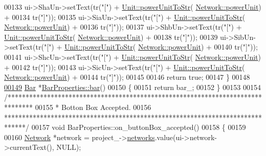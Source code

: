 \begin{DoxyCode}
00133   ui->ShaUn->setText(tr(\textcolor{stringliteral}{"["}) + \hyperlink{class_unit_ad1487441b5a7eb93a3eb0aeebe947725}{Unit::powerUnitToStr}(
      \hyperlink{group___models_ga9504015bc566f4a3d3b4d4a86000293b}{Network::powerUnit}) +
00134                      tr(\textcolor{stringliteral}{"]"}));
00135   ui->SiaUn->setText(tr(\textcolor{stringliteral}{"["}) + \hyperlink{class_unit_ad1487441b5a7eb93a3eb0aeebe947725}{Unit::powerUnitToStr}(
      \hyperlink{group___models_ga9504015bc566f4a3d3b4d4a86000293b}{Network::powerUnit}) +
00136                      tr(\textcolor{stringliteral}{"]"}));
00137   ui->ShbUn->setText(tr(\textcolor{stringliteral}{"["}) + \hyperlink{class_unit_ad1487441b5a7eb93a3eb0aeebe947725}{Unit::powerUnitToStr}(
      \hyperlink{group___models_ga9504015bc566f4a3d3b4d4a86000293b}{Network::powerUnit}) +
00138                      tr(\textcolor{stringliteral}{"]"}));
00139   ui->SibUn->setText(tr(\textcolor{stringliteral}{"["}) + \hyperlink{class_unit_ad1487441b5a7eb93a3eb0aeebe947725}{Unit::powerUnitToStr}(
      \hyperlink{group___models_ga9504015bc566f4a3d3b4d4a86000293b}{Network::powerUnit}) +
00140                      tr(\textcolor{stringliteral}{"]"}));
00141   ui->ShcUn->setText(tr(\textcolor{stringliteral}{"["}) + \hyperlink{class_unit_ad1487441b5a7eb93a3eb0aeebe947725}{Unit::powerUnitToStr}(
      \hyperlink{group___models_ga9504015bc566f4a3d3b4d4a86000293b}{Network::powerUnit}) +
00142                      tr(\textcolor{stringliteral}{"]"}));
00143   ui->SicUn->setText(tr(\textcolor{stringliteral}{"["}) + \hyperlink{class_unit_ad1487441b5a7eb93a3eb0aeebe947725}{Unit::powerUnitToStr}(
      \hyperlink{group___models_ga9504015bc566f4a3d3b4d4a86000293b}{Network::powerUnit}) +
00144                      tr(\textcolor{stringliteral}{"]"}));
00145 
00146   \textcolor{keywordflow}{return} \textcolor{keyword}{true};
00147 \}
00148 
\hypertarget{barproperties_8cpp_source_l00149}{}\hyperlink{class_bar_properties_a65d09e7315764cd4ad33b5a0ded32090}{00149} \hyperlink{class_bar}{Bar} *\hyperlink{class_bar_properties_a65d09e7315764cd4ad33b5a0ded32090}{BarProperties::bar}()
00150 \{
00151   \textcolor{keywordflow}{return} bar\_;
00152 \}
00153 
00154 \textcolor{comment}{/*******************************************************************************}
00155 \textcolor{comment}{ * Botton Box Accepted.}
00156 \textcolor{comment}{ ******************************************************************************/}
00157 \textcolor{keywordtype}{void} BarProperties::on\_buttonBox\_accepted()
00158 \{
00159 
00160   \hyperlink{class_network}{Network} *network = project\_->\hyperlink{class_project_aa98126154cab59769a431668e6f17daf}{networks}.value(ui->network->currentText(), NULL);

\end{DoxyCode}
